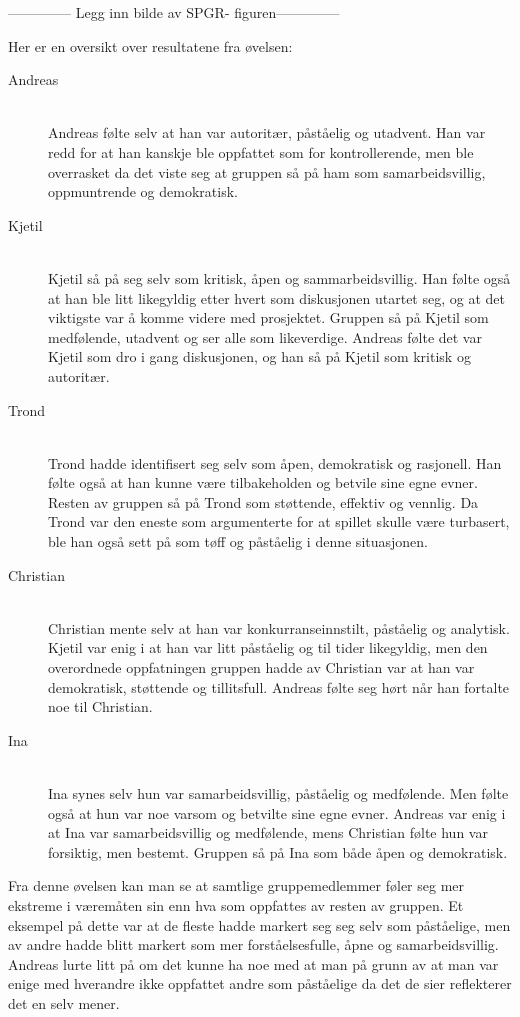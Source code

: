 -------------- Legg inn bilde av SPGR- figuren--------------

Her er en oversikt over resultatene fra øvelsen:
\begin{description}
\item[Andreas] \hfill \\
Andreas følte selv at han var autoritær, påståelig og utadvent. Han var redd for at han kanskje ble oppfattet som for kontrollerende, men ble overrasket da det viste seg at gruppen så på ham som samarbeidsvillig, oppmuntrende og demokratisk. 

\item[Kjetil] \hfill \\
Kjetil så på seg selv som kritisk, åpen og sammarbeidsvillig. Han følte også at han ble litt likegyldig etter hvert som diskusjonen utartet seg, og at det viktigste var å komme videre med prosjektet. Gruppen så på Kjetil som medfølende, utadvent og ser alle som likeverdige. Andreas følte det var Kjetil som dro i gang diskusjonen, og han så på Kjetil som kritisk og autoritær.

\item[Trond] \hfill \\	
Trond hadde identifisert seg selv som åpen, demokratisk og rasjonell. Han følte også at han kunne være tilbakeholden og betvile sine egne evner. Resten av gruppen så på Trond som støttende, effektiv og vennlig. Da Trond var den eneste som argumenterte for at spillet skulle være turbasert, ble han også sett på som tøff og påståelig i denne situasjonen. 

\item[Christian] \hfill \\
Christian mente selv at han var konkurranseinnstilt, påståelig og analytisk. Kjetil var enig i at han var litt påståelig og til tider likegyldig, men den overordnede oppfatningen gruppen hadde av Christian var at han var demokratisk, støttende og tillitsfull. Andreas følte seg hørt når han fortalte noe til Christian.

\item[Ina] \hfill \\
Ina synes selv hun var samarbeidsvillig, påståelig og medfølende. Men følte også at hun var noe varsom og betvilte sine egne evner. Andreas var enig i at Ina var samarbeidsvillig og medfølende, mens Christian følte hun var forsiktig, men bestemt. Gruppen så på Ina som både åpen og demokratisk.  

\end{description}
Fra denne øvelsen kan man se at samtlige gruppemedlemmer føler seg mer ekstreme i væremåten sin enn hva som oppfattes av resten av gruppen. Et eksempel på dette var at de fleste hadde markert seg seg selv som påståelige, men av andre hadde blitt markert som mer forståelsesfulle, åpne og samarbeidsvillig. Andreas lurte litt på om det kunne ha noe med at man på grunn av at man var enige med hverandre ikke oppfattet andre som påståelige da det de sier reflekterer det en selv mener. 

